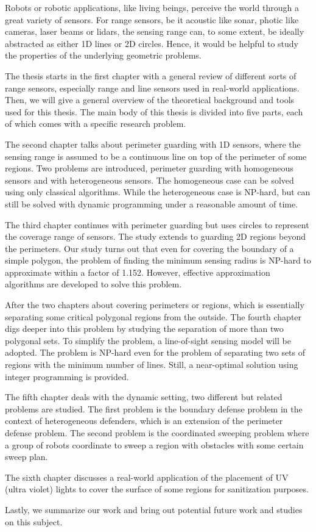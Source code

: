 \begin{my_abstract}

Robots or robotic applications, like living beings, perceive the world through
a great variety of sensors.
For range sensors, be it acoustic like sonar, photic like cameras, laser beams or lidars, 
the sensing range can, to some extent, be ideally abstracted as either 1D lines or 2D circles.
Hence, it would be helpful to study the properties of the underlying geometric problems.

The thesis starts in the first chapter with a general review of different sorts of range sensors, 
especially range and line sensors used in real-world applications. 
Then, we will give a general overview of the theoretical background and tools used for this thesis. 
The main body of this thesis is divided into five parts, each of which comes with 
a specific research problem. 

The second chapter talks about perimeter guarding with 1D sensors, where the sensing range 
is assumed to be a continuous line on top of the perimeter of some regions. Two problems are 
introduced, perimeter guarding with homogeneous sensors and with heterogeneous sensors. 
The homogeneous case can be solved using only classical algorithms. 
While the heterogeneous case is NP-hard, but can still be solved with dynamic programming under a reasonable
amount of time. 

The third chapter continues with perimeter guarding but uses circles to represent the 
coverage range of sensors. The study extends to guarding 2D regions beyond the perimeters. 
Our study turns out that even for covering the boundary of a simple polygon, 
the problem of finding the minimum sensing radius is NP-hard to approximate within a factor of 1.152. 
However, effective approximation algorithms are developed to solve this problem. 

After the two chapters about covering perimeters or regions, which is essentially separating 
some critical polygonal regions from the outside. 
The fourth chapter digs deeper into this problem by studying the separation of more than two polygonal sets. 
To simplify the problem, a line-of-sight sensing model will be adopted. 
The problem is NP-hard even for the problem of separating two sets of regions with the minimum number of lines.
Still, a near-optimal solution using integer programming is provided.

The fifth chapter deals with the dynamic setting, two different but related problems are studied. 
The first problem is the boundary defense problem in the context of heterogeneous defenders,
which is an extension of the perimeter defense problem. 
The second problem is the coordinated sweeping problem where a group of robots coordinate to sweep a region with obstacles with some certain sweep plan. 

The sixth chapter discusses a real-world application of the placement of UV (ultra violet) lights
to cover the surface of some regions for sanitization purposes. 

Lastly, we summarize our work and bring out potential future work and studies on this subject.

\end{my_abstract}

